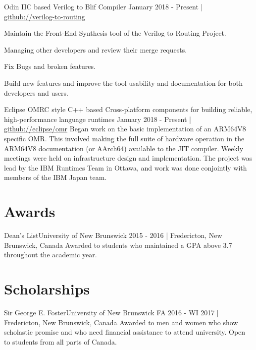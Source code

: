 \documentclass[english,letterpaper]{deedy-resume-openfont}
\begin{document}
\begin{flushleft}
    \employement%
        {Odin II}{C based Verilog to Blif Compiler}
        {January 2018 - Present | \href{https://github.com/verilog-to-routing/vtr-verilog-to-routing/graphs/contributors}{github://verilog-to-routing}}{%
        Maintain the Front-End Synthesis tool of the Verilog to Routing Project.
        \begin{tightemize}
        \item Managing other developers and review their merge requests.
        \item Fix Bugs and broken features.
        \item Build new features and improve the tool usability and documentation for both developers and users.
        \end{tightemize}
        }

    \employement%
        {Eclipse OMR}{C style C++ based Cross-platform components for building reliable, high-performance language runtimes}
        {January 2018 - Present | \href{https://github.com/eclipse/omr}{github://eclipse/omr}}{%
        Began work on the basic implementation of an ARM64V8 specific OMR. 
        This involved making the full suite of hardware operation in the ARM64V8 documentation (or AArch64) available to the JIT compiler. 
        Weekly meetings were held on infrastructure design and implementation. 
        The project was lead by the IBM Runtimes Team in Ottawa, and work was done conjointly with members of the IBM Japan team.
        }

\section{Awards}

    \employement%
        {Dean's List}{University of New Brunswick}
        {2015 - 2016 | Fredericton, New Brunswick, Canada}{%
        Awarded to students who maintained a GPA above 3.7 throughout the academic year.
        }

\section{Scholarships}

    \employement%
        {Sir George E. Foster}{University of New Brunswick}
        {FA 2016 - WI 2017  | Fredericton, New Brunswick, Canada}{%
        Awarded to men and women who show scholastic promise and who need financial assistance to attend university. 
        Open to students from all parts of Canada.
        }


\end{flushleft}
\end{document}
